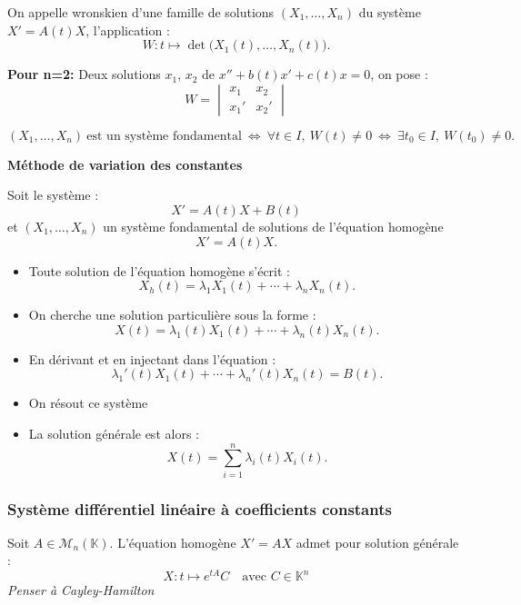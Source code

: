 \documentclass[a4paper,12pt]{report}
\newcommand{\Def}[2]{\begin{tcolorbox}[colback=white,colframe=CornflowerBlue, title=Définition : #1]#2\end{tcolorbox}}
\newcommand{\Thm}[2]{\begin{tcolorbox}[colback=white,colframe=Red!60, title=Théorème : #1]#2\end{tcolorbox}}
\newcommand{\Methode}[2]{\begin{tcolorbox}[colback=white, title=Méthode :  #1]#2\end{tcolorbox}}
\def\K{\mathbb{K}}
\begin{document}
\Def{Wronskien}{
On appelle wronskien d’une famille de solutions $(X_1, \dots, X_n)$ du système $X' = A(t)X$, l’application :
\[
W : t \mapsto \det\big(X_1(t), \dots, X_n(t)\big).
\]

\textbf{Pour n=2:}
Deux solutions $x_1$, $x_2$ de $x'' + b(t)x' + c(t)x = 0$, on pose :
\[
W = 
\begin{vmatrix}
x_1 & x_2 \\
x_1' & x_2'
\end{vmatrix}
\]
}

\Thm{Caractérisation d'un système fondamental avec le wronskien}{
\[
(X_1, \dots, X_n)\ \text{est un système fondamental}
\ \Longleftrightarrow\ 
\forall t \in I,\ W(t) \neq 0
\ \Longleftrightarrow\ 
\exists t_0 \in I,\ W(t_0) \neq 0.
\]
\hspace{1em}
}

\Methode{Variation des constantes}{
\textbf{Méthode de variation des constantes}

Soit le système :
\[
X' = A(t)X + B(t)
\]
et $(X_1, \dots, X_n)$ un système fondamental de solutions de l’équation homogène
\[
X' = A(t)X.
\]

\begin{itemize}
    \item Toute solution de l’équation homogène s’écrit :
    \[
    X_h(t) = \lambda_1 X_1(t) + \cdots + \lambda_n X_n(t).
    \]

    \item On cherche une solution particulière sous la forme :
    \[
    X(t) = \lambda_1(t) X_1(t) + \cdots + \lambda_n(t) X_n(t).
    \]

    \item En dérivant et en injectant dans l’équation :
    \[
    \lambda_1'(t) X_1(t) + \cdots + \lambda_n'(t) X_n(t) = B(t).
    \]
    \item On résout ce système
    \item La solution générale est alors :
    \[
    X(t) = \sum_{i=1}^n \lambda_i(t) X_i(t).
    \]
\end{itemize}
}
\subsubsection{Système différentiel linéaire à coefficients constants}

\Thm{Solution générale à coefficients constants}{
Soit $A \in \mathcal{M}_n(\K)$. L’équation homogène $X' = AX$ admet pour solution générale :\\
\[
X : t \mapsto e^{tA}C \quad \text{avec } C \in \K^n
\]
\textit{Penser à Cayley-Hamilton}
}
\end{document}
